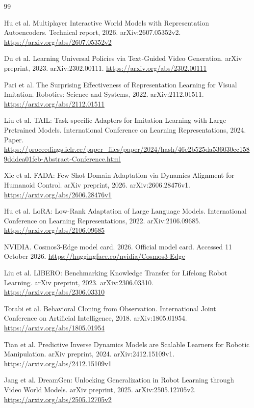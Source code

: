 \documentclass[11pt,a4paper]{article}
\begin{document}
\begin{thebibliography}{99}

Hu et al. Multiplayer Interactive World Models with Representation Autoencoders. Technical report, 2026. arXiv:2607.05352v2. \url{https://arxiv.org/abs/2607.05352v2}

Du et al. Learning Universal Policies via Text-Guided Video Generation. arXiv preprint, 2023. arXiv:2302.00111. \url{https://arxiv.org/abs/2302.00111}

Pari et al. The Surprising Effectiveness of Representation Learning for Visual Imitation. Robotics: Science and Systems, 2022. arXiv:2112.01511. \url{https://arxiv.org/abs/2112.01511}

Liu et al. TAIL: Task-specific Adapters for Imitation Learning with Large Pretrained Models. International Conference on Learning Representations, 2024. Paper. \url{https://proceedings.iclr.cc/paper_files/paper/2024/hash/46e2b525da536030ec1589dddea01feb-Abstract-Conference.html}

Xie et al. FADA: Few-Shot Domain Adaptation via Dynamics Alignment for Humanoid Control. arXiv preprint, 2026. arXiv:2606.28476v1. \url{https://arxiv.org/abs/2606.28476v1}

Hu et al. LoRA: Low-Rank Adaptation of Large Language Models. International Conference on Learning Representations, 2022. arXiv:2106.09685. \url{https://arxiv.org/abs/2106.09685}

NVIDIA. Cosmos3-Edge model card. 2026. Official model card. Accessed 11 October 2026. \url{https://huggingface.co/nvidia/Cosmos3-Edge}

Liu et al. LIBERO: Benchmarking Knowledge Transfer for Lifelong Robot Learning. arXiv preprint, 2023. arXiv:2306.03310. \url{https://arxiv.org/abs/2306.03310}

Torabi et al. Behavioral Cloning from Observation. International Joint Conference on Artificial Intelligence, 2018. arXiv:1805.01954. \url{https://arxiv.org/abs/1805.01954}

Tian et al. Predictive Inverse Dynamics Models are Scalable Learners for Robotic Manipulation. arXiv preprint, 2024. arXiv:2412.15109v1. \url{https://arxiv.org/abs/2412.15109v1}

Jang et al. DreamGen: Unlocking Generalization in Robot Learning through Video World Models. arXiv preprint, 2025. arXiv:2505.12705v2. \url{https://arxiv.org/abs/2505.12705v2}


\end{thebibliography}
\end{document}
